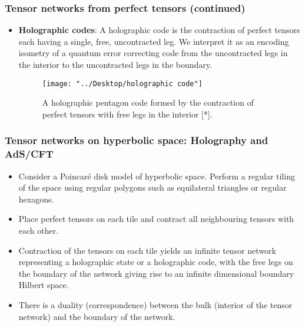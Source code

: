\documentclass[11pt]{beamer}
\begin{document}
\begin{frame}
	\frametitle{Tensor networks from perfect tensors (continued)}
	
	\begin{itemize}
		\item \textbf{Holographic codes}: A holographic code is the contraction of perfect tensors each having a single, free, uncontracted leg. We interpret it as an encoding isometry of a quantum error correcting code from the uncontracted legs in the interior to the uncontracted legs in the boundary.
		
			\begin{figure}
			\centering
			\texttt{[image: "../Desktop/holographic code"]}
			\caption{A holographic pentagon code formed by the contraction of perfect tensors with free legs in the interior [*].}
			\label{fig:holographic-code}
		\end{figure}
		
	\end{itemize}
	
\end{frame}


\begin{frame}
	
	\frametitle{Tensor networks on hyperbolic space: Holography and AdS/CFT}
	
	
	\begin{itemize}
		
		
		\item Consider a Poincaré disk model of hyperbolic space. Perform a regular tiling of the space using regular polygons such as equilateral triangles or regular hexagons. 
		
		\item Place perfect tensors on each tile and contract all neighbouring tensors with each other.
		
		\item Contraction of the tensors on each tile yields an infinite tensor network representing a holographic state or a holographic code, with the free legs on the boundary of the network giving rise to an infinite dimensional boundary Hilbert space. %
		
		\item There is a duality (correspondence) between the bulk (interior of the tensor network) and the boundary of the network.
		
	\end{itemize}
	
\end{frame}
\end{document}

